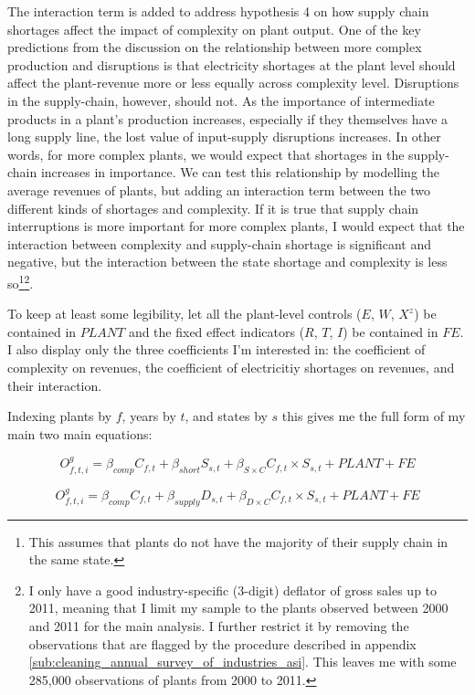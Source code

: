 \documentclass[11pt]{article}
\begin{document}
The interaction term is added to address hypothesis 4 on how supply chain shortages affect the impact of complexity on plant output. One of the key predictions from the discussion on the relationship between more complex production and disruptions is that electricity shortages at the plant level should affect the plant-revenue more or less equally across complexity level. Disruptions in the supply-chain, however, should not. As the importance of intermediate products in a plant's production increases, especially if they themselves have a long supply line, the lost value of input-supply disruptions increases. In other words, for more complex plants, we would expect that shortages in the supply-chain increases in importance. We can test this relationship by modelling the average revenues of plants, but adding an interaction term between the two different kinds of shortages and complexity. If it is true that supply chain interruptions is more important for more complex plants, I would expect that the interaction between complexity and supply-chain shortage is significant and negative, but the interaction between the state shortage and complexity is less so\footnote{This assumes that plants do not have the majority of their supply chain in the same state.}\footnote{I only have a good industry-specific (3-digit) deflator of gross sales up to 2011, meaning that I limit my sample to the plants observed between 2000 and 2011 for the main analysis. I further restrict it by removing the observations that are flagged by the procedure described in appendix \ref{sub:cleaning_annual_survey_of_industries_asi}. This leaves me with some 285,000 observations of plants from 2000 to 2011.}.

To keep at least some legibility, let all the plant-level controls ($E$, $W$, $X^{z}$) be contained in $PLANT$ and the fixed effect indicators ($R$, $T$, $I$) be contained in $FE$. I also display only the three coefficients I'm interested in: the coefficient of complexity on revenues, the coefficient of electricitiy shortages on revenues, and their interaction.

Indexing plants by $f$, years by $t$, and states by $s$ this gives me the full form of my main two main equations:

\begin{equation}
\label{eqn:int_shortages}
O^{g}_{f,t,i} = \beta_{comp} C_{f,t} + \beta_{short} S_{s,t} + \beta_{S\times C} C_{f,t} \times S_{s,t} + PLANT + FE
\end{equation}

\begin{equation}
\label{eqn:int_supply}
O^{g}_{f,t,i} = \beta_{comp} C_{f,t} + \beta_{supply} D_{s,t} + \beta_{D\times C} C_{f,t} \times S_{s,t} + PLANT + FE
\end{equation}
\end{document}
